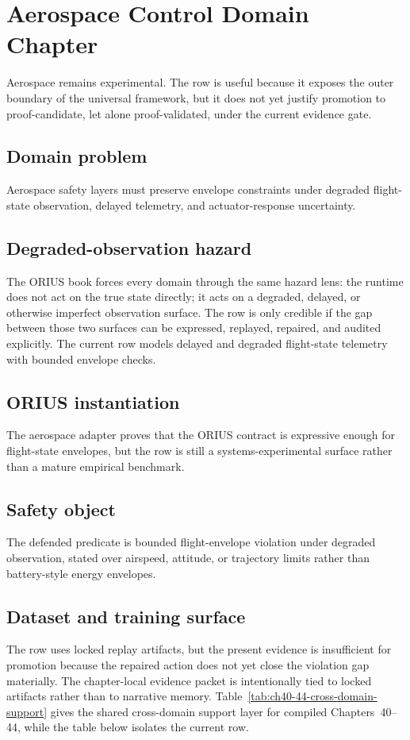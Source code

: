 \chapter{Aerospace Control Domain Chapter}
\label{ch:domain-aerospace}

Aerospace remains experimental. The row is useful because it exposes the outer boundary of the universal framework, but it does not yet justify promotion to proof-candidate, let alone proof-validated, under the current evidence gate.

\section{{Domain problem}}
Aerospace safety layers must preserve envelope constraints under degraded flight-state observation, delayed telemetry, and actuator-response uncertainty.

\section{{Degraded-observation hazard}}
The ORIUS book forces every domain through the same hazard lens: the runtime does not act
on the true state directly; it acts on a degraded, delayed, or otherwise imperfect
observation surface.  The row is only credible if the gap between those two surfaces can
be expressed, replayed, repaired, and audited explicitly.
The current row models delayed and degraded flight-state telemetry with bounded envelope checks.

\section{{ORIUS instantiation}}
The aerospace adapter proves that the ORIUS contract is expressive enough for flight-state envelopes, but the row is still a systems-experimental surface rather than a mature empirical benchmark.

\section{{Safety object}}
The defended predicate is bounded flight-envelope violation under degraded observation, stated over airspeed, attitude, or trajectory limits rather than battery-style energy envelopes.

\section{{Dataset and training surface}}
The row uses locked replay artifacts, but the present evidence is insufficient for promotion because the repaired action does not yet close the violation gap materially.
The chapter-local evidence packet is intentionally tied to locked artifacts rather than to
narrative memory.  Table~\ref{tab:ch40-44-cross-domain-support} gives the shared cross-domain
support layer for compiled Chapters~40--44, while the table below isolates the current row.

